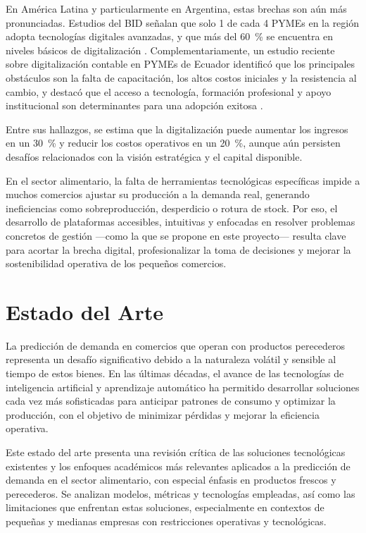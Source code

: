 En América Latina y particularmente en Argentina, estas brechas son aún más pronunciadas. Estudios del BID señalan que solo 1 de cada 4 PYMEs en la región adopta tecnologías digitales avanzadas, y que más del 60~\% se encuentra en niveles básicos de digitalización \parencite{bid2020}. Complementariamente, un estudio reciente sobre digitalización contable en PYMEs de Ecuador identificó que los principales obstáculos son la falta de capacitación, los altos costos iniciales y la resistencia al cambio, y destacó que el acceso a tecnología, formación profesional y apoyo institucional son determinantes para una adopción exitosa \parencite{vasconez2025}.

Entre sus hallazgos, se estima que la digitalización puede aumentar los ingresos en un 30~\% y reducir los costos operativos en un 20~\%, aunque aún persisten desafíos relacionados con la visión estratégica y el capital disponible.

En el sector alimentario, la falta de herramientas tecnológicas específicas impide a muchos comercios ajustar su producción a la demanda real, generando ineficiencias como sobreproducción, desperdicio o rotura de stock. Por eso, el desarrollo de plataformas accesibles, intuitivas y enfocadas en resolver problemas concretos de gestión —como la que se propone en este proyecto— resulta clave para acortar la brecha digital, profesionalizar la toma de decisiones y mejorar la sostenibilidad operativa de los pequeños comercios.

\chapter{Estado del Arte}\label{chapter03}

La predicción de demanda en comercios que operan con productos perecederos representa un desafío significativo debido a la naturaleza volátil y sensible al tiempo de estos bienes. En las últimas décadas, el avance de las tecnologías de inteligencia artificial y aprendizaje automático ha permitido desarrollar soluciones cada vez más sofisticadas para anticipar patrones de consumo y optimizar la producción, con el objetivo de minimizar pérdidas y mejorar la eficiencia operativa.

Este estado del arte presenta una revisión crítica de las soluciones tecnológicas existentes y los enfoques académicos más relevantes aplicados a la predicción de demanda en el sector alimentario, con especial énfasis en productos frescos y perecederos. Se analizan modelos, métricas y tecnologías empleadas, así como las limitaciones que enfrentan estas soluciones, especialmente en contextos de pequeñas y medianas empresas con restricciones operativas y tecnológicas.

